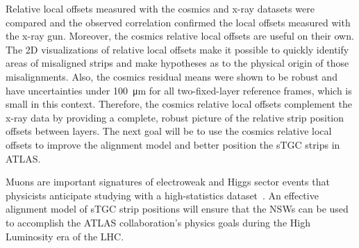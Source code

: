 Relative local offsets measured with the cosmics and x-ray datasets were compared and the observed correlation confirmed the local offsets measured with the x-ray gun. Moreover, the cosmics relative local offsets are useful on their own. The 2D visualizations of relative local offsets make it possible to quickly identify areas of misaligned strips and make hypotheses as to the physical origin of those misalignments. Also, the cosmics residual means were shown to be robust and have uncertainties under \SI{100}{\micro\meter} for all two-fixed-layer reference frames, which is small in this context. Therefore, the cosmics relative local offsets complement the x-ray data by providing a complete, robust picture of the relative strip position offsets between layers. The next goal will be to use the cosmics relative local offsets to improve the alignment model and better position the sTGC strips in ATLAS.

Muons are important signatures of electroweak and Higgs sector events that physicists anticipate studying with a high-statistics dataset~\cite{dainese_physics_2018, nsw_tdr}. An effective alignment model of sTGC strip positions will ensure that the NSWs can be used to accomplish the ATLAS collaboration's physics goals during the High Luminosity era of the LHC.



